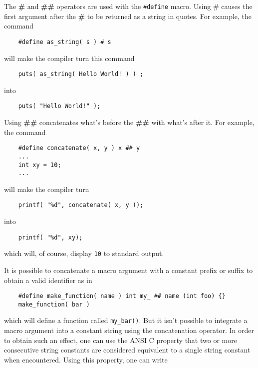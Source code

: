 The \textbf{\#} and \textbf{\#\#} operators are used with the \texttt{\#define} macro. Using \# causes the first argument after the \textbf{\#} to be returned as a string in quotes. For example, the command 

\begin{verbatim}
	#define as_string( s ) # s
\end{verbatim}
		
will make the compiler turn this command 

\begin{verbatim}
	puts( as_string( Hello World! ) ) ;
\end{verbatim}
		
into 

\begin{verbatim}
	puts( "Hello World!" );
\end{verbatim}
		
Using \textbf{\#\#} concatenates what's before the \textbf{\#\#} with what's after it. For example, the command 

\begin{verbatim}
	#define concatenate( x, y ) x ## y
	...
	int xy = 10;
	...
\end{verbatim}
	
will make the compiler turn 

\begin{verbatim}
	printf( "%d", concatenate( x, y ));
\end{verbatim}
		
into 

\begin{verbatim}
	printf( "%d", xy);
\end{verbatim}
		
which will, of course, display \texttt{10} to standard output.

It is possible to concatenate a macro argument with a constant prefix or suffix to obtain a valid identifier as in

\begin{verbatim}
	#define make_function( name ) int my_ ## name (int foo) {}
	make_function( bar )
\end{verbatim}

which will define a function called \texttt{my\_bar()}. But it isn't possible to integrate a macro argument into a constant string using the concatenation operator. In order to obtain such an effect, one can use the ANSI C property that two or more consecutive string constants are considered equivalent to a single string constant when encountered. Using this property, one can write


